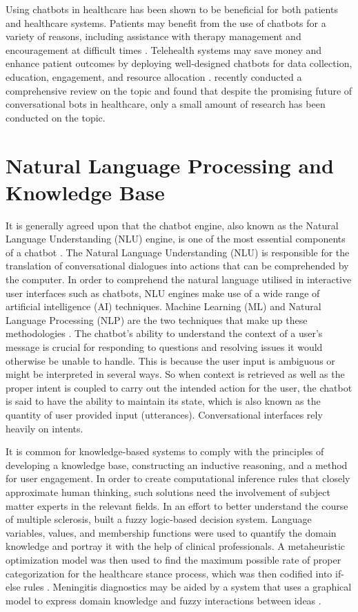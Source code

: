 Using chatbots in healthcare has been shown to be beneficial for both patients and healthcare systems. Patients may benefit from the use of chatbots for a variety of reasons, including assistance with therapy management and encouragement at difficult times \citep{lit.ch8}. Telehealth systems may save money and enhance patient outcomes by deploying well-designed chatbots for data collection, education, engagement, and resource allocation \citep{lit.ch3}. \citet{lit.ch1} recently conducted a comprehensive review on the topic and found that despite the promising future of conversational bots in healthcare, only a small amount of research has been conducted on the topic.

\section{Natural Language Processing and Knowledge Base}
It is generally agreed upon that the chatbot engine, also known as the Natural Language Understanding (NLU) engine, is one of the most essential components of a chatbot \citep{lit.kn1}. The Natural Language Understanding (NLU) is responsible for the translation of conversational dialogues into actions that can be comprehended by the computer. In order to comprehend the natural language utilised in interactive user interfaces such as chatbots, NLU engines make use of a wide range of artificial intelligence (AI) techniques. Machine Learning (ML) and Natural Language Processing (NLP) are the two techniques that make up these methodologies \citep{lit.kn1}. The chatbot's ability to understand the context of a user's message is crucial for responding to questions and resolving issues it would otherwise be unable to handle. This is because the user input is ambiguous or might be interpreted in several ways. So when context is retrieved as well as the proper intent is coupled to carry out the intended action for the user, the chatbot is said to have the ability to maintain its state, which is also known as the quantity of user provided input (utterances). Conversational interfaces rely heavily on intents.

It is common for knowledge-based systems to comply with the principles of developing a knowledge base, constructing an inductive reasoning, and a method for user engagement. In order to create computational inference rules that closely approximate human thinking, such solutions need the involvement of subject matter experts in the relevant fields. In an effort to better understand the course of multiple sclerosis, \cite{lit4} built a fuzzy logic-based decision system. Language variables, values, and membership functions were used to quantify the domain knowledge and portray it with the help of clinical professionals. A metaheuristic optimization model was then used to find the maximum possible rate of proper categorization for the healthcare stance process, which was then codified into if-else rules \citep{lit4}. Meningitis diagnostics may be aided by a system that uses a graphical model to express domain knowledge and fuzzy interactions between ideas \citep{lit5}.

